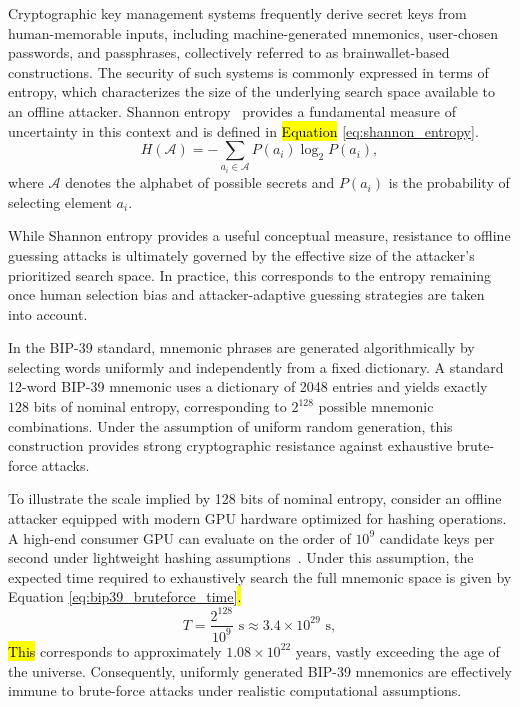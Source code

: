 \documentclass[mathematics,article,accept,pdftex,moreauthors]{Definitions/mdpi}
\begin{document}
Cryptographic key management systems frequently derive secret keys from human-memorable inputs, including machine-generated mnemonics, user-chosen passwords, and passphrases, collectively referred to as brainwallet-based constructions. The security of such systems is commonly expressed in terms of entropy, which characterizes the size of the underlying search space available to an offline attacker. Shannon entropy~\cite{Shannon1948} provides a fundamental measure of uncertainty in this context and is defined in \hl{Equation} \eqref{eq:shannon_entropy}.
\begin{equation}
H(\mathcal{A}) = -\sum_{a_i \in \mathcal{A}} P(a_i)\log_2 P(a_i),
\label{eq:shannon_entropy}
\end{equation}
where $\mathcal{A}$ denotes the alphabet of possible secrets and $P(a_i)$ is the probability of selecting element $a_i$.

While Shannon entropy provides a useful conceptual measure, resistance to offline guessing attacks is ultimately governed by the effective size of the attacker’s prioritized search space. In practice, this corresponds to the entropy remaining once human selection bias and attacker-adaptive guessing strategies are taken into account.

In the BIP-39 standard, mnemonic phrases are generated algorithmically by selecting words uniformly and independently from a fixed dictionary. A standard 12-word BIP-39 mnemonic uses a dictionary of 2048 entries and yields exactly \(128\) bits of nominal entropy, corresponding to \(2^{128}\) possible mnemonic combinations. Under the assumption of uniform random generation, this construction provides strong cryptographic resistance against exhaustive brute-force attacks.

To illustrate the scale implied by 128 bits of nominal entropy, consider an offline attacker equipped with modern GPU hardware optimized for hashing operations. A high-end consumer GPU can evaluate on the order of $10^{9}$ candidate keys per second under lightweight hashing assumptions~\cite{Choi2024,Qiu2016,Durmuth2015}. Under this assumption, the expected time required to exhaustively search the full mnemonic space is given by Equation \eqref{eq:bip39_bruteforce_time}\hl{.} %
\begin{equation}
T = \frac{2^{128}}{10^{9}} \text{ s} \approx 3.4 \times 10^{29} \text{ s},
\label{eq:bip39_bruteforce_time}
\end{equation}
\hl{This} %
corresponds to approximately $1.08 \times 10^{22}$ years, vastly exceeding the age of the universe. Consequently, uniformly generated BIP-39 mnemonics are effectively immune to brute-force attacks under realistic computational assumptions.
\end{document}
